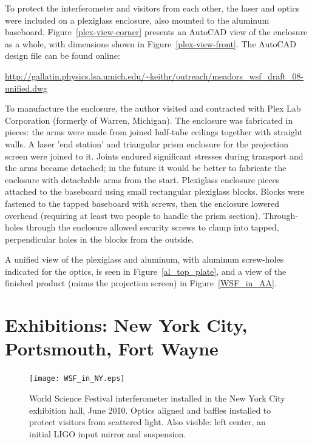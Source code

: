 To protect the interferometer and visitors from each other, the laser and optics were included on a plexiglass enclosure, also mounted to the aluminum baseboard.
Figure~\ref{plex-view-corner} presents an AutoCAD view of the enclosure as a whole, with dimensions shown in Figure~\ref{plex-view-front}. 
The AutoCAD design file can be found online:

\url{http://gallatin.physics.lsa.umich.edu/~keithr/outreach/meadors_wsf_draft_08-unified.dwg}

To manufacture the enclosure, the author visited and contracted with Plex Lab Corporation (formerly of Warren, Michigan).
The enclosure was fabricated in pieces: the arms were made from joined half-tube ceilings together with straight walls.
A laser 'end station' and triangular prism enclosure for the projection screen were joined to it.
Joints endured significant stresses during transport and the arms became detached; in the future it would be better to fabricate the enclosure with detachable arms from the start.
Plexiglass enclosure pieces attached to the baseboard using small rectangular plexiglass blocks.
Blocks were fastened to the tapped baseboard with screws, then the enclosure lowered overhead (requiring at least two people to handle the prism section).
Through-holes through the enclosure allowed security screws to clamp into tapped, perpendicular holes in the blocks from the outside.

A unified view of the plexiglass and aluminum, with aluminum screw-holes indicated for the optics, is seen in Figure~\ref{al_top_plate}, and a view of the finished product (minus the projection screen) in Figure~\ref{WSF_in_AA}.




    \section{Exhibitions: New York City, Portsmouth, Fort Wayne}
    \label{exhibitions}

	\begin{figure}
	\begin{center}
	\texttt{[image: WSF\_in\_NY.eps]}
	\caption{World Science Festival interferometer installed in the New York City exhibition hall, June 2010. Optics aligned and baffles installed to protect visitors from scattered light. Also visible: left center, an initial LIGO input mirror and suspension.}
	\label{WSF_IFO_photo}
	\end{center}
	\end{figure}

